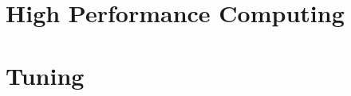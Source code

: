 \documentclass[12pt,twoside,a4paper]{scrbook}
\begin{document}
 

 \thispagestyle{empty}
 \newpage
 \cleardoublepage 

 \pagestyle{plain}
 

 \cleardoublepage 
 
 \tableofcontents

 \newpage

 \cleardoublepage 

 \pagestyle{plain}

 
 
 

 
 
  \chapter{High Performance Computing}
  


  \chapter{Tuning}
  
  
  
  

 
\end{document}
